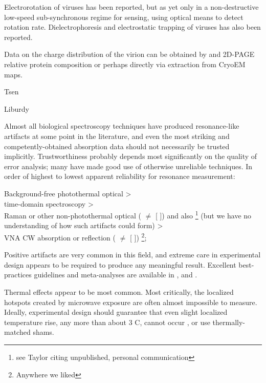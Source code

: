 \documentclass[paper.tex]{subfiles}
\begin{document}
Electrorotation\cite{Electrorotation1988}\cite{Electrorotation1997} of viruses has been reported\cite{Analysis2004}\cite{New1999}\cite{comprehensive2001}, but as yet only in a non-destructive low-speed sub-synchronous regime for sensing, using optical means to detect rotation rate. Dielectrophoresis and electrostatic trapping of viruses has also been reported.

Data on the charge distribution of the virion can be obtained by and 2D-PAGE relative protein composition or perhaps directly via extraction from CryoEM maps.


Tsen 

Liburdy

Almost all biological spectroscopy techniques have produced resonance-like artifacts at some point in the literature, and even the most striking and competently-obtained absorption data should not necessarily be trusted implicitly. Trustworthiness probably depends most significantly on the quality of error analysis; many have made good use of otherwise unreliable techniques. In order of highest to lowest apparent reliability for resonance measurement:

Background-free photothermal optical \cite{Microwave1993a}\cite{Broadband1988} >\\ time-domain spectroscopy\cite{Time2003}\cite{Dielectric2004}\cite{Microwave1994} >\\ Raman or other non-photothermal optical (\cite{optical1983} $\neq$ [\cite{Resonances1987} \cite{Dielectric1989}]) and also \footnote{see Taylor \cite{mechanisms1981} citing unpublished, personal communication} (but we have no understanding of how such artifacts could form) >\\ VNA CW absorption or reflection (\cite{Microwave1982} $\neq$ [\cite{Resonances1987} \cite{Dielectric1989}]) \cite{Substitution1982} \cite{Millimeter1980} \footnote{Anywhere we liked};

Positive artifacts are very common in this field, and extreme care in experimental design appears to be required to produce any meaningful result. Excellent best-practices guidelines and meta-analyses are available in \cite{Biological2016} \cite{Comprehensive2018} \cite{Funding2019}, \cite{chou1996radio} and \cite{Effects2016}.

Thermal effects appear to be most common. Most critically, the localized hotspots created by microwave exposure are often almost impossible to measure. Ideally, experimental design should guarantee that even slight localized temperature rise, any more than about 3 C, cannot occur \cite{DNA2004}, or use thermally-matched shams. 
\end{document}
